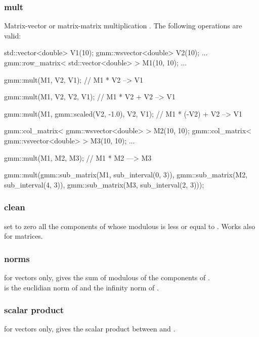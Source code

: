 \documentclass[11pt,a4paper]{article}
\begin{document}
\subsubsection{mult}
Matrix-vector or matrix-matrix multiplication . The following operations are valid:
\begin{cppcode}
  std::vector<double> V1(10);
  gmm::wsvector<double> V2(10);
  ...
  gmm::row_matrix< std::vector<double> > M1(10, 10);
  ...

  gmm::mult(M1, V2, V1);  // M1 * V2 --> V1

  gmm::mult(M1, V2, V2, V1);  // M1 * V2 + V2 --> V1

  gmm::mult(M1, gmm::scaled(V2, -1.0), V2, V1);  // M1 * (-V2) + V2 --> V1

  gmm::col_matrix< gmm::wsvector<double> > M2(10, 10);
  gmm::col_matrix< gmm::vsvector<double> > M3(10, 10);
  ...
  
  gmm::mult(M1, M2, M3); // M1 * M2 ---> M3
  
  gmm::mult(gmm::sub_matrix(M1, sub_interval(0, 3)),
            gmm::sub_matrix(M2, sub_interval(4, 3)),
            gmm::sub_matrix(M3, sub_interval(2, 3)));

\end{cppcode}

\subsubsection{clean}
  set to zero all the components of  whose modulous is less or equal to . Works also for matrices.

\subsubsection{norms}
  for vectors only,  gives the sum of modulous of the components of .\\
 is the euclidian norm of  and  the infinity norm of .

\subsubsection{scalar product} 
  for vectors only,  gives the scalar product between  and .
\end{document}
